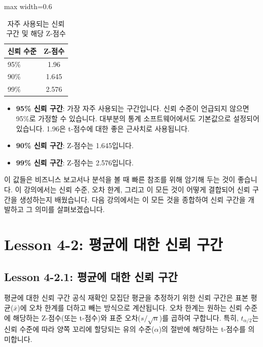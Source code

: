 \documentclass[11pt,a4paper]{article}
\begin{document}
\begin{table}[h!]
\centering
\caption{자주 사용되는 신뢰 구간 및 해당 Z-점수}
\label{tab:common_confidence_intervals}
\begin{adjustbox}{max width=0.6\textwidth}
\begin{tabular}{lc}
\toprule
\textbf{신뢰 수준} & \textbf{Z-점수} \\
\midrule
95\% & 1.96 \\
90\% & 1.645 \\
99\% & 2.576 \\
\bottomrule
\end{tabular}
\end{adjustbox}
\begin{itemize}
    \item \textbf{95\% 신뢰 구간}: 가장 자주 사용되는 구간입니다. 신뢰 수준이 언급되지 않으면 95\%로 가정할 수 있습니다. 대부분의 통계 소프트웨어에서도 기본값으로 설정되어 있습니다. 1.96은 t-점수에 대한 좋은 근사치로 사용됩니다.
    \item \textbf{90\% 신뢰 구간}: Z-점수는 1.645입니다.
    \item \textbf{99\% 신뢰 구간}: Z-점수는 2.576입니다.
\end{itemize}
이 값들은 비즈니스 보고서나 분석을 볼 때 빠른 참조를 위해 암기해 두는 것이 좋습니다.
이 강의에서는 신뢰 수준, 오차 한계, 그리고 이 모든 것이 어떻게 결합되어 신뢰 구간을 생성하는지 배웠습니다. 다음 강의에서는 이 모든 것을 종합하여 신뢰 구간을 개발하고 그 의미를 살펴보겠습니다.

\end{table}

\newpage
\section{Lesson 4-2: 평균에 대한 신뢰 구간}

\subsection{Lesson 4-2.1: 평균에 대한 신뢰 구간}

\begin{summarybox}{평균에 대한 신뢰 구간 공식 재확인}
  모집단 평균을 추정하기 위한 신뢰 구간은 표본 평균($\bar{x}$)에 오차 한계를 더하고 빼는 방식으로 계산됩니다.
  오차 한계는 원하는 신뢰 수준에 해당하는 Z-점수(또는 t-점수)와 표준 오차($s/\sqrt{n}$)를 곱하여 구합니다.
  특히, $t_{\alpha/2}$는 신뢰 수준에 따라 양쪽 꼬리에 할당되는 유의 수준($\alpha$)의 절반에 해당하는 t-점수를 의미합니다.
\end{summarybox}
\end{document}
